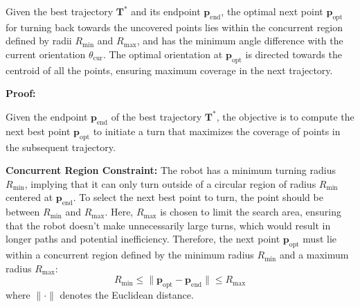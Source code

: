 



\vspace*{6mm}  



\begin{lemma}
Given the best trajectory $\mathbf{T}^*$ and its endpoint $\mathbf{p}_{\text{end}}$, the optimal next point $\mathbf{p}_{\text{opt}}$ for turning back towards the uncovered points lies within the concurrent region defined by radii $R_{\min}$ and $R_{\max}$, and has the minimum angle difference with the current orientation $\theta_{\text{cur}}$. The optimal orientation at $\mathbf{p}_{\text{opt}}$ is directed towards the centroid of all the points, ensuring maximum coverage in the next trajectory.
\end{lemma}

\textbf{Proof:} 

\vspace*{2mm}  



Given the endpoint $\mathbf{p}_{\text{end}}$ of the best trajectory $\mathbf{T}^*$, the objective is to compute the next best point $\mathbf{p}_{\text{opt}}$ to initiate a turn that maximizes the coverage of points in the subsequent trajectory.

\vspace{6mm}  


\textbf{Concurrent Region Constraint:}
The robot has a minimum turning radius $R_{\min}$, implying that it can only turn outside of a circular region of radius $R_{\min}$ centered at $\mathbf{p}_{\text{end}}$. To select the next best point to turn, the point should be between $R_{\min}$ and $R_{\max}$. Here, $R_{\max}$ is chosen to limit the search area, ensuring that the robot doesn't make unnecessarily large turns, which would result in longer paths and potential inefficiency. Therefore, the next point $\mathbf{p}_{\text{opt}}$ must lie within a concurrent region defined by the minimum radius $R_{\min}$ and a maximum radius $R_{\max}$:
\[
R_{\min} \leq \|\mathbf{p}_{\text{opt}} - \mathbf{p}_{\text{end}}\| \leq R_{\max}
\]
where $\|\cdot\|$ denotes the Euclidean distance.

